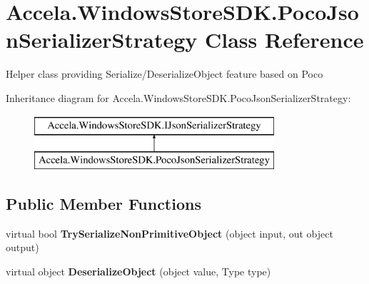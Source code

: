 \hypertarget{class_accela_1_1_windows_store_s_d_k_1_1_poco_json_serializer_strategy}{\section{Accela.\+Windows\+Store\+S\+D\+K.\+Poco\+Json\+Serializer\+Strategy Class Reference}
\label{class_accela_1_1_windows_store_s_d_k_1_1_poco_json_serializer_strategy}
}


Helper class providing Serialize/\+Deserialize\+Object feature based on Poco  


Inheritance diagram for Accela.\+Windows\+Store\+S\+D\+K.\+Poco\+Json\+Serializer\+Strategy\+:\begin{figure}[H]
\begin{center}
\leavevmode
\includegraphics[height=2.000000cm]{class_accela_1_1_windows_store_s_d_k_1_1_poco_json_serializer_strategy}
\end{center}
\end{figure}
\subsection*{Public Member Functions}
\begin{DoxyCompactItemize}
\item 
\hypertarget{class_accela_1_1_windows_store_s_d_k_1_1_poco_json_serializer_strategy_a76159abe57bfbe8c43b6eb64b096dfe8}{virtual bool {\bfseries Try\+Serialize\+Non\+Primitive\+Object} (object input, out object output)}\label{class_accela_1_1_windows_store_s_d_k_1_1_poco_json_serializer_strategy_a76159abe57bfbe8c43b6eb64b096dfe8}

\item 
\hypertarget{class_accela_1_1_windows_store_s_d_k_1_1_poco_json_serializer_strategy_a3d8f91bb6313bca197b7148bc1cdb8a9}{virtual object {\bfseries Deserialize\+Object} (object value, Type type)}\label{class_accela_1_1_windows_store_s_d_k_1_1_poco_json_serializer_strategy_a3d8f91bb6313bca197b7148bc1cdb8a9}

\end{DoxyCompactItemize}
